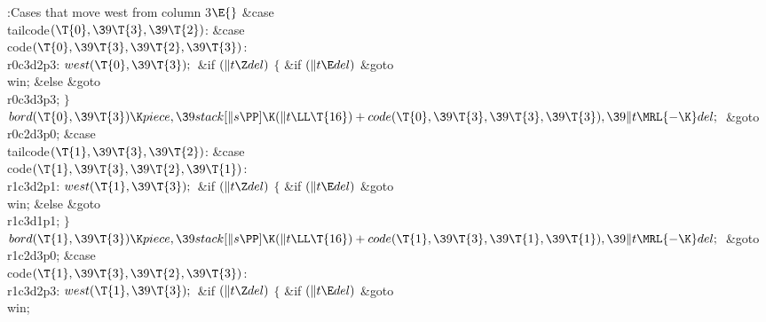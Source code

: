 \B{}:Cases that move west from column 3\X${}\E{}$\6
\4\&{case} \\{tailcode}${}(\T{0},\39\T{3},\39\T{2}){}$:\5
\&{case} \\{code}${}(\T{0},\39\T{3},\39\T{2},\39\T{3}){}$:\5
\\{r0c3d2p3}:\5
${}\\{west}(\T{0},\39\T{3});{}$\6
\&{if} ${}(\|t\Z\\{del}){}$\5
${}\{{}$\5
\1\&{if} ${}(\|t\E\\{del}){}$\1\5
\&{goto} \\{win};\5
\2\&{else}\1\5
\&{goto} \\{r0c3d3p3};\5
\2${}\}{}$\2\6
${}\\{bord}(\T{0},\39\T{3})\K\\{piece},\39\\{stack}[\|s\PP]\K(\|t\LL\T{16})+%
\\{code}(\T{0},\39\T{3},\39\T{3},\39\T{3}),\39\|t\MRL{-{\K}}\\{del};{}$\6
\&{goto} \\{r0c2d3p0};\6
\4\&{case} \\{tailcode}${}(\T{1},\39\T{3},\39\T{2}){}$:\5
\&{case} \\{code}${}(\T{1},\39\T{3},\39\T{2},\39\T{1}){}$:\5
\\{r1c3d2p1}:\5
${}\\{west}(\T{1},\39\T{3});{}$\6
\&{if} ${}(\|t\Z\\{del}){}$\5
${}\{{}$\5
\1\&{if} ${}(\|t\E\\{del}){}$\1\5
\&{goto} \\{win};\5
\2\&{else}\1\5
\&{goto} \\{r1c3d1p1};\5
\2${}\}{}$\2\6
${}\\{bord}(\T{1},\39\T{3})\K\\{piece},\39\\{stack}[\|s\PP]\K(\|t\LL\T{16})+%
\\{code}(\T{1},\39\T{3},\39\T{1},\39\T{1}),\39\|t\MRL{-{\K}}\\{del};{}$\6
\&{goto} \\{r1c2d3p0};\6
\4\&{case} \\{code}${}(\T{1},\39\T{3},\39\T{2},\39\T{3}){}$:\5
\\{r1c3d2p3}:\5
${}\\{west}(\T{1},\39\T{3});{}$\6
\&{if} ${}(\|t\Z\\{del}){}$\5
${}\{{}$\5
\1\&{if} ${}(\|t\E\\{del}){}$\1\5
\&{goto} \\{win};\5
